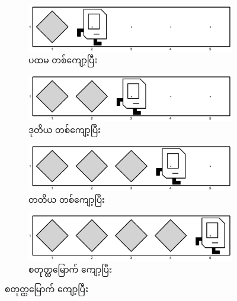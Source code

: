 \begin{figure}[thb!]
    \newcommand{\figpctw}{0.49}
    \begin{subfigure}[t]{{\figpctw}\textwidth}
        \includegraphics[scale=0.15]{images/ch04/mrofb/1st_iter.jpg}
        \caption{ပထမ တစ်ကျော့ပြီး}  
        \label{fig:mrofb_recur2}   
    \end{subfigure}
    \begin{subfigure}[t]{{\figpctw}\textwidth}
        \includegraphics[scale=0.15]{images/ch04/mrofb/2nd_iter.jpg}
        \caption{ဒုတိယ တစ်ကျော့ပြီး}  
        \label{fig:mrofb_recur3}  
    \end{subfigure}
    \begin{subfigure}[t]{{\figpctw}\textwidth}
        \includegraphics[scale=0.15]{images/ch04/mrofb/3rd_iter.jpg}
        \caption{တတိယ တစ်ကျော့ပြီး}  
        \label{fig:mrofb_recur4}  
    \end{subfigure}
    \begin{subfigure}[t]{{\figpctw}\textwidth}
        \includegraphics[scale=0.15]{images/ch04/mrofb/4th_iter.jpg}
        \caption{စတုတ္ထမြောက် ကျော့ပြီး}  
        \label{fig:mrofb_recur5}  
    \end{subfigure}

\end{figure}
